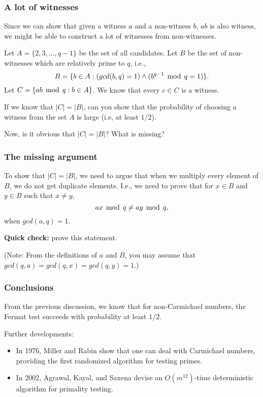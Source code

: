 \begin{frame}\frametitle{A lot of witnesses}
  Since we can show that given a witness $a$ and a non-witness $b$,
  $ab$ is also witness, we might be able to construct a lot of
  witnesses from non-witnesses.  \pause
  
  Let $A=\{2,3,\ldots,q-1\}$ be the set of all candidates.  Let $B$ be
  the set of non-witnesses which are relatively prime to $q$, i.e., \[
  B=\{b\in A : (gcd(b,q)=1) \wedge (b^{q-1}\,\bmod\, q = 1)\}. \] Let
  $C=\{ab\,\bmod\, q : b\in A \}$.  We know that every $c\in C$ is a
  witness.

  \pause If we know that $|C| = |B|$, can you show that the
  probability of choosing a witness from the set $A$ is large (i.e, at
  least $1/2$).

  \pause Now, is it obvious that $|C| = |B|$?  What is missing?
\end{frame}

\begin{frame}\frametitle{The missing argument}
  To show that $|C|=|B|$, we need to argue that when we multiply every
  element of $B$, we do not get duplicate elements.  I.e., we need to
  prove that for $x\in B$ and $y\in B$ such that $x\neq y$,
  \[ ax\,\bmod\, q \neq ay\,\bmod\, q,\]
  when $gcd(a,q)=1$.

  {\bf Quick check:} prove this statement.

  (Note: From the definitions of $a$ and $B$, you may assume that
  $gcd(q,a)=gcd(q,x)=gcd(q,y)=1$.)
\end{frame}

\begin{frame}\frametitle{Conclusions}
  From the previous discussion, we know that for non-Carmichael
  numbers, the Fermat test succeeds with probability at least $1/2$.

  Further developments:
  \begin{itemize}
  \item In 1976, Miller and Rabin show that one can deal with
    Carmichael numbers, providing the first randomized algorithm for
    testing primes.
  \item In 2002, Agrawal, Kayal, and Saxena devise an $O(m^{12})$-time
    deterministic algorithm for primality testing.
  \end{itemize}
\end{frame}
